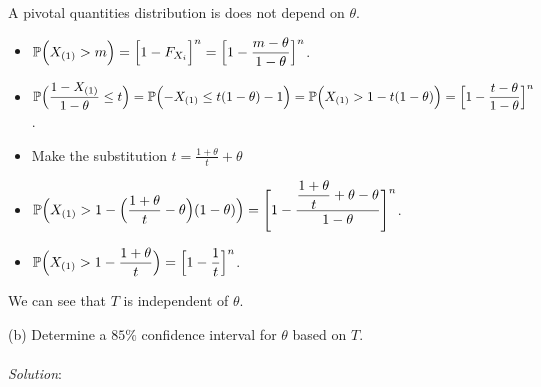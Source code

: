 \documentclass[12pt]{article}
\newcommand{\ds}{\displaystyle}
\begin{document}
\noindent
A pivotal quantities distribution is does not depend on $ \theta $. \\

\noindent

\begin{itemize}
    \item $ \ds \mathbb{P} \Bigl( X_{(1)} > m \Bigr) = \Bigl[ 1 - F_{X_{i}} \Bigr]^{n} = \Bigl[ 1 - \frac{m - \theta}{1 - \theta} \Bigr]^{n} $. \\
    \item $ \ds \mathbb{P} \Bigl( \frac{1 - X_{(1)}}{1 - \theta} \le t \Bigr) = \mathbb{P} \Bigl( -X_{(1)} \le t(1 - \theta) - 1 \Bigr) = \mathbb{P} \Bigl( X_{(1)} > 1 - t(1 - \theta) \Bigr) = \Bigl[ 1 - \frac{t - \theta}{1 - \theta} \Bigr]^{n} $. \\
    \item Make the substitution $ \ds t = \frac{1 + \theta}{t} + \theta $
    \item $ \ds \mathbb{P} \Bigl( X_{(1)} > 1 - \Bigl( \frac{1 + \theta}{t} - \theta \Bigr)(1 - \theta) \Bigr) = \Biggl[ 1 - \frac{\ds \frac{1 + \theta}{t} + \theta - \theta}{1 - \theta} \Biggr]^{n} $. \\
    \item $ \ds \mathbb{P} \Bigl( X_{(1)} > 1 - \frac{1 + \theta}{t} \Bigr) = \Bigl[ 1 - \frac{1}{t} \Bigr]^{n} $. \\
\end{itemize}

\noindent
We can see that $ T $ is independent of $ \theta $. \\

\vspace{2.5mm}

\newpage

(b) Determine a $ 85\% $ confidence interval for $ \theta $ based on $ T $. \\
\vspace{2.5mm} \\
\textit{Solution}:
\vspace{2.5mm} \\
\end{document}
